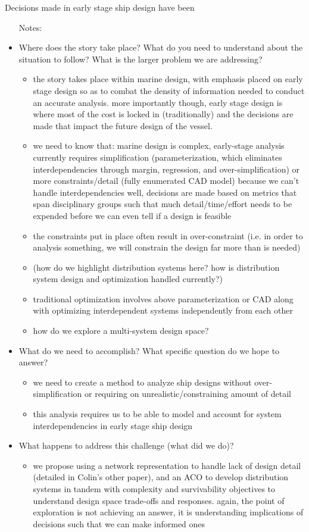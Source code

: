 \documentclass[preprint,12pt]{elsarticle}
\begin{document}
Decisions made in early stage ship design have been 
\begin{itemize}
	\item[Notes:]
	\item Where does the story take place? What do you need to understand about the situation to follow? What is the larger problem we are addressing?
	\begin{itemize}
		\item the story takes place within marine design, with emphasis placed on early stage design so as to combat the density of information needed to conduct an accurate analysis. more importantly though, early stage design is where most of the cost is locked in (traditionally) and the decisions are made that impact the future design of the vessel.
		\item we need to know that: marine design is complex, early-stage analysis currently requires simplification (parameterization, which eliminates interdependencies through margin, regression, and over-simplification) or more constraints/detail (fully enumerated CAD model) because we can't handle interdependencies well, decisions are made based on metrics that span disciplinary groups such that much detail/time/effort needs to be expended before we can even tell if a design is feasible
		\item the constraints put in place often result in over-constraint (i.e. in order to analysis something, we will constrain the design far more than is needed)
		\item (how do we highlight distribution systems here? how is distribution system design and optimization handled currently?)
		\item traditional optimization involves above parameterization or CAD along with optimizing interdependent systems independently from each other
		\item how do we explore a multi-system design space?
	\end{itemize}
	\item What do we need to accomplish? What specific question do we hope to answer?
	\begin{itemize}
		\item we need to create a method to analyze ship designs without over-simplification or requiring on unrealistic/constraining amount of detail
		\item this analysis requires us to be able to model and account for system interdependencies in early stage ship design
	\end{itemize}
	\item What happens to address this challenge (what did we do)?
	\begin{itemize}
		\item we propose using a network representation to handle lack of design detail (detailed in Colin's other paper), and an ACO to develop distribution systems in tandem with complexity and survivability objectives to understand design space trade-offs and responses. again, the point of exploration is not achieving an answer, it is understanding implications of decisions such that we can make informed ones
	\end{itemize}
\end{itemize}
\end{document}
